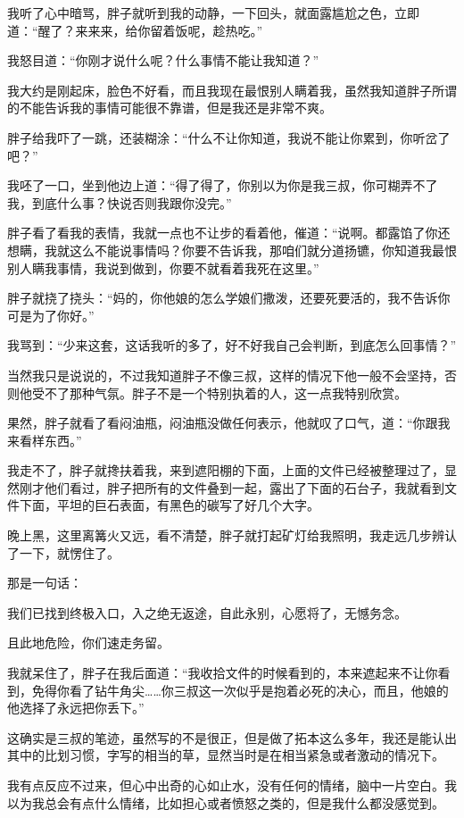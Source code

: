 我听了心中暗骂，胖子就听到我的动静，一下回头，就面露尴尬之色，立即道：“醒了？来来来，给你留着饭呢，趁热吃。”

我怒目道：“你刚才说什么呢？什么事情不能让我知道？”

我大约是刚起床，脸色不好看，而且我现在最恨别人瞒着我，虽然我知道胖子所谓的不能告诉我的事情可能很不靠谱，但是我还是非常不爽。

胖子给我吓了一跳，还装糊涂：“什么不让你知道，我说不能让你累到，你听岔了吧？”

我呸了一口，坐到他边上道：“得了得了，你别以为你是我三叔，你可糊弄不了我，到底什么事？快说否则我跟你没完。”

胖子看了看我的表情，我就一点也不让步的看着他，催道：“说啊。都露馅了你还想瞒，我就这么不能说事情吗？你要不告诉我，那咱们就分道扬镳，你知道我最恨别人瞒我事情，我说到做到，你要不就看着我死在这里。”

胖子就挠了挠头：“妈的，你他娘的怎么学娘们撒泼，还要死要活的，我不告诉你可是为了你好。”

我骂到：“少来这套，这话我听的多了，好不好我自己会判断，到底怎么回事情？”

当然我只是说说的，不过我知道胖子不像三叔，这样的情况下他一般不会坚持，否则他受不了那种气氛。胖子不是一个特别执着的人，这一点我特别欣赏。

果然，胖子就看了看闷油瓶，闷油瓶没做任何表示，他就叹了口气，道：“你跟我来看样东西。”

我走不了，胖子就搀扶着我，来到遮阳棚的下面，上面的文件已经被整理过了，显然刚才他们看过，胖子把所有的文件叠到一起，露出了下面的石台子，我就看到文件下面，平坦的巨石表面，有黑色的碳写了好几个大字。

晚上黑，这里离篝火又远，看不清楚，胖子就打起矿灯给我照明，我走远几步辨认了一下，就愣住了。

那是一句话：

我们已找到终极入口，入之绝无返途，自此永别，心愿将了，无憾务念。

且此地危险，你们速走务留。

我就呆住了，胖子在我后面道：“我收拾文件的时候看到的，本来遮起来不让你看到，免得你看了钻牛角尖……你三叔这一次似乎是抱着必死的决心，而且，他娘的他选择了永远把你丢下。”

这确实是三叔的笔迹，虽然写的不是很正，但是做了拓本这么多年，我还是能认出其中的比划习惯，字写的相当的草，显然当时是在相当紧急或者激动的情况下。

我有点反应不过来，但心中出奇的心如止水，没有任何的情绪，脑中一片空白。我以为我总会有点什么情绪，比如担心或者愤怒之类的，但是我什么都没感觉到。

